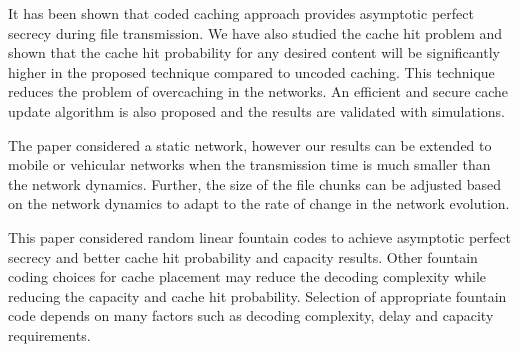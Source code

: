 \documentclass[10pt,journal]{IEEEtran}
\begin{document}
{It has been  shown that coded caching approach provides asymptotic perfect secrecy during file transmission. We have also studied the cache hit problem and shown that the cache hit probability for any desired content will be significantly higher in the proposed technique compared to uncoded caching. This technique reduces the problem of overcaching in the networks. An efficient and secure cache update algorithm is also proposed and the results are validated with simulations. 

The paper considered a static network, however our results can be extended to mobile or vehicular networks when the transmission time is much smaller than the network dynamics.
Further, the size of the file chunks can be adjusted based on the network dynamics to adapt to the rate of change in the network evolution. %

This paper considered random linear fountain codes to achieve asymptotic perfect secrecy and better cache hit probability and capacity results. 
 Other fountain coding choices for cache placement may reduce the decoding complexity while reducing the capacity and cache hit probability. Selection of appropriate fountain code depends on many factors such as  decoding complexity, delay and capacity requirements.




}
\end{document}
